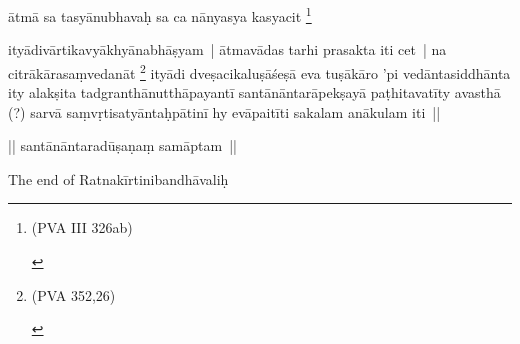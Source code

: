 \documentclass[article,a4paper]{memoir}
\begin{document}
	  \pstart ā\-tmā\- sa tasyā\-nubhavaḥ sa ca nā\-nyasya kasyacit \footnote{\begin{english}(PVA III 326ab)\end{english}}
	\pend
      

	  \pstart ityā\-divā\-rtikavyā\-khyā\-nabhā\-ṣyam | \label{thakur75-149.18} ā\-tmavā\-das tarhi prasakta iti cet | na citrā\-kā\-rasaṃvedanā\-t \footnote{\begin{english}(PVA 352,26)\end{english}} ityā\-di dveṣacikaluṣā\-śeṣā\- eva tuṣā\-kā\-ro 'pi vedā\-ntasiddhā\-nta ity alakṣita tadgranthā\-nutthā\-payantī\- santā\-nā\-ntarā\-pekṣayā\- paṭhitavatī\-ty avasthā\- (?) sarvā\- saṃvṛtisatyā\-ntaḥpā\-tinī\- hy evā\-paitī\-ti sakalam anā\-kulam iti ||
	\pend
      

	  \pstart || santā\-nā\-ntaradū\-ṣaṇaṃ samā\-ptam || \textunderscore \textunderscore \textunderscore \textunderscore \textunderscore \textunderscore \textunderscore \textunderscore \textunderscore \textunderscore \textunderscore \textunderscore \textunderscore \textunderscore \textunderscore \textunderscore \textunderscore \textunderscore \textunderscore \textunderscore \textunderscore \textunderscore \textunderscore \textunderscore \textunderscore \textunderscore \textunderscore \textunderscore \textunderscore \textunderscore \textunderscore \textunderscore \textunderscore \textunderscore \textunderscore \textunderscore \textunderscore \textunderscore \textunderscore \textunderscore \textunderscore \textunderscore \textunderscore \textunderscore \textunderscore \textunderscore \textunderscore \textunderscore \textunderscore \textunderscore \textunderscore \textunderscore \textunderscore \textunderscore \textunderscore \textunderscore \textunderscore \textunderscore \textunderscore 
	\pend
      

	  \pstart The end of Ratnakī\-rtinibandhā\-valiḥ 
	\pend
      
	    
	    \endnumbering%
	    \endgroup
	    
	  \backmatter 
\end{document}
